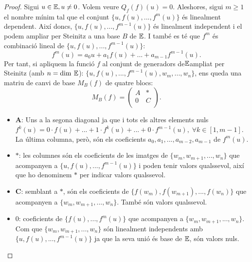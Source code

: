 \begin{proof}

Sigui $u \in \mathbb{E}, u \neq 0$. Volem veure $Q_f(f)(u) = 0$. Aleshores, sigui $m\geq 1$ el nombre mínim tal que el conjunt $\{u,f(u),...,f^m(u)\}$ és linealment dependent. Així doncs, $\{u,f(u),...,f^{m-1}(u)\}$ és linealment independent i el podem ampliar per Steinitz a una base $B$ de $\mathbb{E}$. I també es té que $f^m$ és combinació lineal de $\{u,f(u),...,f^{m-1}(u)\}$:
\[ f^m(u) = a_0u + a_1f(u) + ... + a_{m-1}f^{m-1}(u). \]
Per tant, si apliquem la funció $f$ al conjunt de generadors de$\mathbb{E}$ampliat per Steinitz (amb $n = \dim\:\mathbb{E}$): $\{u,f(u),...,f^{m-1}(u), w_{m},...,w_n\}$, ens queda una matriu de canvi de base $M_B(f)$ de quatre blocs:
\[ M_B(f) = 
    \begin{pmatrix}
        A & * \\
        0  & C \\
    \end{pmatrix}.
\]
\begin{itemize}
    \item \textbf{A}: Uns a la segona diagonal ja que i tots els altres elements nuls $f^k(u) = 0\cdot f(u) + ... + 1\cdot f^k(u) + ... + 0\cdot f^{m-1}(u), \; \forall k \in [1,m-1] $. La última columna, però, són els coeficients $a_0,a_1,...,a_{m-2},a_{m-1}$ de $f^m(u)$.
    
    \item $\mathbf{*}$: les columnes són els coeficients de les imatges de $\{w_{m}, w_{m+1}, ..., w_{n}\}$ que acompanyen a $\{u,f(u),...,f^{m-1}(u)\}$ i poden tenir valors qualssevol, així que ho denominem $\mathbf{*}$ per indicar valors qualssevol.
    
    \item \textbf{C}: semblant a $\mathbf{*}$, són els coeficients de $\{f(w_{m}), f(w_{m+1}), ..., f(w_{n})\}$ que acompanyen a $\{w_{m}, w_{m+1}, ..., w_{n}\}$. També són valors qualssevol.
    
    \item $0$: coeficients de $\{f(u),...,f^{m}(u)\}$ que acompanyen a $\{w_{m}, w_{m+1}, ..., w_{n}\}$. Com que $\{w_{m}, w_{m+1}, ..., w_{n}\}$ són linealment independents amb $\{u,f(u), ..., f^{m-1}(u)\}$ ja que la seva unió és base de $\mathbb{E}$, són valors nuls.
\end{itemize}


\end{proof}
